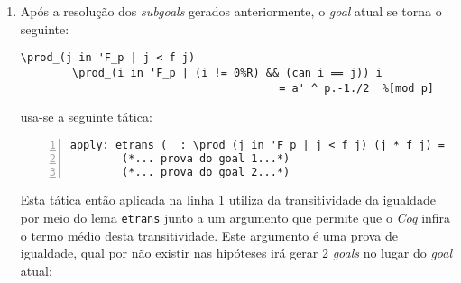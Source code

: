 \begin{enumerate}[label=\textbf{\roman*.}]
\begin{enumerate}[listparindent=\parindent]
                Nesta subprova usa-se então o lema \lstinline[language=coq]|partition_big| com \lstinline[language=coq]|P i| sendo a condição \lstinline[language=coq]|(i != 0)|, \lstinline[language=coq]|p| sendo a função \lstinline[language=coq]|can| e \lstinline[language=coq]|Q j| sendo a condição \lstinline[language=coq]|(j < f(j))|. Após o uso de tal lema é então necessário provar mais um subgoal:
                \begin{lstlisting}[language=coq,frame=single,tabsize=1]
forall i : 
 fintype_ordinal__canonical__fintype_Finite (Zp_trunc (pdiv p)).+2,
        (i  \in 'F_p) && (i != 0%R) -> (can i  \in 'F_p) && (can i < f (can i))
                \end{lstlisting}
                onde a expressão:
                
                \begin{lstlisting}[language=coq,frame=single,tabsize=1]
fintype_ordinal__canonical__fintype_Finite (Zp_trunc (pdiv p)).+2
                \end{lstlisting}
                equivale à \lstinline[language=coq]|'F_p|, pois basta realizar uma computação sobre a primeira para verificar isto, o que pode ser feito utilizando nesse caso a tática:

                \begin{lstlisting}[language=coq,frame=single,tabsize=1]
rewrite [X in forall i : X, _]/=.
                \end{lstlisting}
                


        \end{enumerate}

        \item Após a resolução dos \textit{subgoals} gerados anteriormente, o \textit{goal} atual se torna o seguinte:
                \begin{lstlisting}[language=coq,frame=single,tabsize=1]
\prod_(j in 'F_p | j < f j) 
        \prod_(i in 'F_p | (i != 0%R) && (can i == j)) i
                                        = a' ^ p.-1./2  %[mod p]
                \end{lstlisting}
        usa-se a seguinte tática:
                \begin{lstlisting}[language=coq,frame=single, numbers=left,stepnumber=1,tabsize=1]
apply: etrans (_ : \prod_(j in 'F_p | j < f j) (j * f j) = _ %[mod p]).
        (*... prova do goal 1...*)
        (*... prova do goal 2...*)
                \end{lstlisting}
        Esta tática então aplicada na linha 1 utiliza da transitividade da igualdade por meio do lema \lstinline[language=coq]|etrans| junto a um argumento que permite que o \textit{Coq} infira o termo médio desta transitividade. Este argumento é uma prova de igualdade, qual por não existir nas hipóteses irá gerar 2 \textit{goals} no lugar do \textit{goal} atual:


\end{enumerate}
